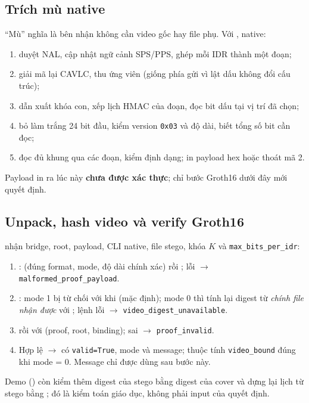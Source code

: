 \documentclass[11pt,a4paper]{article}
\begin{document}
\subsection{Trích mù native}

``Mù'' nghĩa là bên nhận không cần video gốc hay file phụ. Với
, native:
\begin{enumerate}
  \item duyệt NAL, cập nhật ngữ cảnh SPS/PPS, ghép mỗi IDR thành một đoạn;
  \item giải mã lại CAVLC, thu ứng viên (giống phía gửi vì lật dấu không đổi cấu trúc);
  \item dẫn xuất khóa con, xếp lịch HMAC của đoạn, đọc bit dấu tại vị trí đã chọn;
  \item bỏ làm trắng 24 bit đầu, kiểm version \texttt{0x03} và độ dài, biết tổng số bit cần đọc;
  \item đọc đủ khung qua các đoạn, kiểm định dạng; in payload hex hoặc thoát mã 2.
\end{enumerate}
Payload in ra lúc này \textbf{chưa được xác thực}; chỉ bước Groth16 dưới đây mới quyết định.

\subsection{Unpack, hash video và verify Groth16}

 nhận bridge, root, payload, CLI native, file stego,
khóa $K$ và \texttt{max\_bits\_per\_idr}:
\begin{enumerate}
  \item {}:  (đúng format, mode, độ dài chính
  xác) rồi ; lỗi $\to$ \texttt{malformed\_proof\_payload}.
  \item {}: mode 1 bị từ chối với 
  khi  (mặc định); mode 0 thì
   tính lại digest từ \emph{chính file nhận được} với
  ; lệnh lỗi $\to$
  \texttt{video\_digest\_unavailable}.
  \item {} rồi  với
  (proof, root, binding); sai $\to$ \texttt{proof\_invalid}.
  \item Hợp lệ $\to$  có \texttt{valid=True}, mode và message; thuộc tính
  \texttt{video\_bound} đúng khi mode = 0. Message chỉ được dùng sau bước này.
\end{enumerate}
Demo () còn kiểm thêm digest của stego bằng digest của cover và
dựng lại lịch từ stego bằng ; đó là kiểm toán giáo dục, không
phải input của quyết định.
\end{document}
